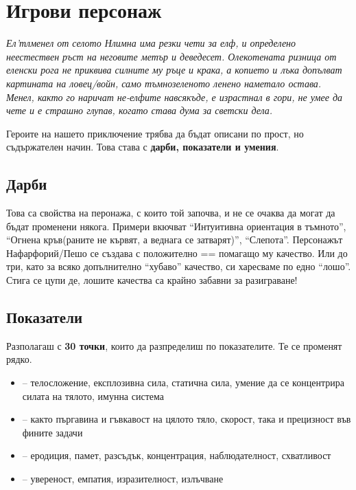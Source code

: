 
\section{Игрови персонаж}
\emph{Ел'тлменел от селото Нлимна има резки чети за елф, и определено неестествен ръст на неговите метър и деведесет.
Олекотената ризница от еленски рога не приквива силните му ръце и крака, а копието и лъка допълват картината на ловец/войн, само тъмнозеленото ленено наметало остава.
Менел, както го наричат не-елфите навсякъде, е израстнал в гори, не умее да чете и е страшно глупав, когато става дума за светски дела.}

Героите на нашето приключение трябва да бъдат описани по прост, но съдържателен начин.
Това става с \textbf{дарби, показатели и умения}.

\subsection{Дарби}
Това са свойства на перонажа, с които той започва, и не се очаква да могат да бъдат променени някога.
Примери вкючват “Интуитивна ориентация в тъмното”, “Огнена кръв(раните не кървят, а веднага се затварят)”, “Слепота”.
Персонажът Нафарфорий/Пешо се създава с { положително} == помагащо му качество.
Или до { три}, като за всяко допълнително “хубаво” качество, си харесваме по едно “лошо”. Стига се цупи де, лошите качества са крайно забавни за разиграване!

\subsection{Показатели}
Разполагаш с \textbf{30 точки}, които да разпределиш по показателите. Те се променят рядко.
\begin{itemize}
\item {} – телосложение, експлозивна сила, статична сила, умение да се концентрира силата на тялото, имунна система
\item {} – както пъргавина и гъвкавост на цялото тяло, скорост, така и прецизност във фините задачи
\item {} – еродиция, памет, разсъдък, концентрация, наблюдателност, схватливост
\item {} – увереност, емпатия, изразителност, излъчване
\end{itemize}

